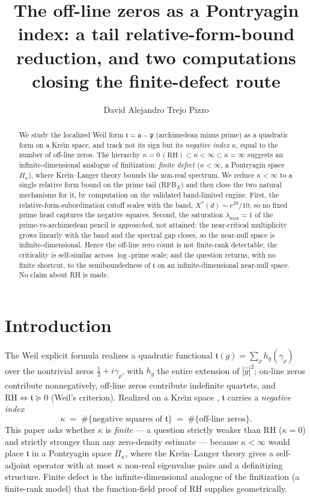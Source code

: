 \documentclass[11pt]{amsart}
\title[The Pontryagin-Index Route]{The off-line zeros as a Pontryagin index: a tail relative-form-bound
reduction, and two computations closing the finite-defect route}
\author{David Alejandro Trejo Pizzo}
\theoremstyle{definition}
\theoremstyle{remark}
\newcommand{\fa}{\mathfrak a}
\newcommand{\fp}{\mathfrak p}
\newcommand{\ft}{\mathfrak t}
\newcommand{\RH}{\mathrm{RH}}
\begin{document}
\nocite{bgdeBranges,bgKL,bgBognar,bgAzizov,bgLagarias,bgLevinson,bgConrey89}
\begin{abstract}
We study the localized Weil form $\ft=\fa-\fp$ (archimedean minus prime) as a
quadratic form on a Kre\u\i n space, and track not its sign but its
\emph{negative index} $\kappa$, equal to the number of off-line zeros. The
hierarchy $\kappa=0\,(\RH)\subset\kappa<\infty\subset\kappa=\infty$ suggests an
infinite-dimensional analogue of finitization: \emph{finite defect}
($\kappa<\infty$, a Pontryagin space $\Pi_\kappa$), where Kre\u\i n--Langer
theory bounds the non-real spectrum. We reduce $\kappa<\infty$ to a single
relative form bound on the prime tail (RFB$_X$) and then close the two natural
mechanisms for it, by computation on the validated band-limited engine. First,
the relative-form-subordination cutoff scales with the band,
$X^\ast(d)\sim e^{2d}/10$, so no fixed prime head captures the negative squares.
Second, the saturation $\lambda_{\max}=1$ of the prime-vs-archimedean pencil is
\emph{approached}, not attained: the near-critical multiplicity grows linearly
with the band and the spectral gap closes, so the near-null space is
infinite-dimensional. Hence the off-line zero count is not finite-rank
detectable; the criticality is self-similar across $\log$-prime scale; and the
question returns, with no finite shortcut, to the semiboundedness of $\ft$ on an
infinite-dimensional near-null space. No claim about RH is made.
\end{abstract}
\maketitle

\tableofcontents
\newpage

\section{Introduction}
The Weil explicit formula realizes a quadratic functional
$\ft(g)=\sum_\rho h_g(\gamma_\rho)$ over the nontrivial zeros
$\tfrac12+i\gamma_\rho$, with $h_g$ the entire extension of $|\widehat g|^2$;
on-line zeros contribute nonnegatively, off-line zeros contribute indefinite
quartets, and $\RH\iff\ft\succeq0$ (Weil's criterion). Realized on a Kre\u\i n
space \cite{P8}, $\ft$ carries a \emph{negative index}
\[
\kappa\;=\;\#\{\text{negative squares of }\ft\}\;=\;\#\{\text{off-line zeros}\}.
\]
This paper asks whether $\kappa$ is \emph{finite} --- a question strictly
weaker than RH ($\kappa=0$) and strictly stronger than any zero-density
estimate --- because $\kappa<\infty$ would place $\ft$ in a Pontryagin space
$\Pi_\kappa$, where the Kre\u\i n--Langer theory \cite{KL} gives a self-adjoint
operator with at most $\kappa$ non-real eigenvalue pairs and a definitizing
structure. Finite defect is the infinite-dimensional analogue of the
finitization (a finite-rank model) that the function-field proof of RH supplies
geometrically.
\end{document}
